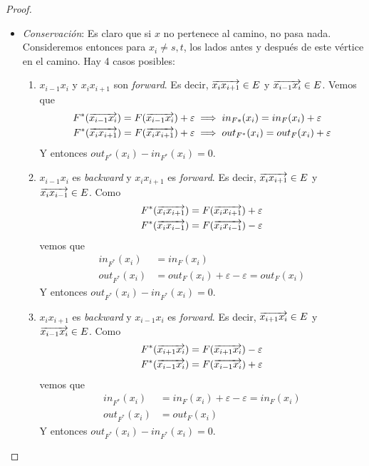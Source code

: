 \begin{proof}
\begin{itemize}
  \item[] \emph{Conservación}: Es claro que si $x$ no pertenece al camino, no
    pasa nada. Consideremos entonces para $x_i \neq s, t$, los lados antes y
    después de este vértice en el camino. Hay 4 casos posibles:
    \begin{enumerate}
    \item $x_{i-1}x_i$ y $x_ix_{i+1}$ son \emph{forward}. Es decir,
      $\overrightarrow{x_i x_{i+1}} \in E$ y $\overrightarrow{x_{i-1} x_i} \in E$. Vemos que
      \begin{align}
        F^*(\overrightarrow{x_{i-1} x_i}) = F(\overrightarrow{x_{i-1} x_i}) + \varepsilon
        &\implies in_{F*} (x_i) = in_F(x_i) + \varepsilon\\
        F^*(\overrightarrow{x_i x_{i+1}}) = F(\overrightarrow{x_i x_{i+1}}) + \varepsilon
        &\implies out_{F^*}(x_i) = out_F(x_i) + \varepsilon
      \end{align}
      Y entonces $out_{F^*} (x_i) - in_{F^*}(x_i) = 0$.

    \item $x_{i-1}x_i$ es \emph{backward} y $x_ix_{i+1}$ es \emph{forward}. Es decir,
    $\overrightarrow{x_i x_{i+1}} \in E$ y $\overrightarrow{x_i x_{i-1}} \in E$. Como
      \begin{align}
        F^*(\overrightarrow{x_i x_{i+1}}) &= F(\overrightarrow{x_i x_{i+1}}) + \varepsilon\\
        F^*(\overrightarrow{x_i x_{i-1}}) &= F(\overrightarrow{x_i x_{i-1}}) - \varepsilon
      \end{align}
      vemos que
      \begin{align}
        in_{F^*} (x_i) &= in_F(x_i)\\
        out_{F^*}(x_i) &= out_F(x_i) + \varepsilon - \varepsilon = out_F(x_i)
      \end{align}
      Y entonces $out_{F^*}(x_i) - in_{F^*}(x_i) = 0$.

    \item $x_ix_{i+1}$ es \emph{backward} y $x_{i-1}x_i$ es \emph{forward}. Es decir,
    $\overrightarrow{x_{i+1} x_i} \in E$ y $\overrightarrow{x_{i-1} x_i} \in E$. Como
    \begin{align}
        F^*(\overrightarrow{x_{i+1} x_i}) &= F(\overrightarrow{x_{i+1} x_i}) - \varepsilon\\
        F^*(\overrightarrow{x_{i-1} x_i}) &= F(\overrightarrow{x_{i-1} x_i}) + \varepsilon 
    \end{align}
    vemos que
    \begin{align}
        in_{F^*} (x_i) &= in_F(x_i) + \varepsilon - \varepsilon = in_F(x_i)\\
        out_{F^*}(x_i) &= out_F(x_i)
    \end{align}
    Y entonces $out_{F^*}(x_i) - in_{F^*}(x_i) = 0$.


\end{enumerate}
\end{itemize}
\end{proof}
